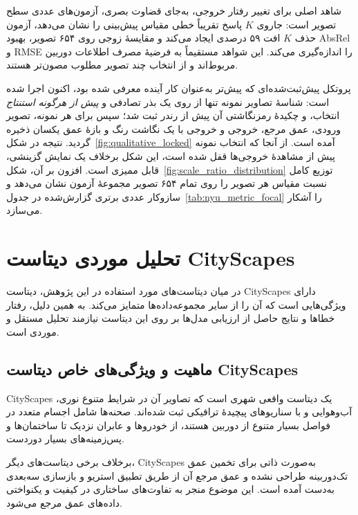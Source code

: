 شاهد اصلی برای تغییر رفتار خروجی، به‌جای قضاوت بصری، آزمون‌های عددی سطح تصویر است: جاروی $K$ پاسخ تقریباً خطی مقیاس پیش‌بینی را نشان می‌دهد، آزمون حذف $K$ افت ۵۹ درصدی ایجاد می‌کند و مقایسهٔ زوجی روی ۶۵۴ تصویر، بهبود AbsRel و RMSE را اندازه‌گیری می‌کند. این شواهد مستقیماً به فرضیهٔ مصرف اطلاعات دوربین مربوط‌اند و از انتخاب چند تصویر مطلوب مصون‌تر هستند.

پروتکل پیش‌ثبت‌شده‌ای که پیش‌تر به‌عنوان کار آینده معرفی شده بود، اکنون اجرا
شده است: شناسهٔ تصاویر نمونه تنها از روی یک بذر تصادفی و \emph{پیش از هرگونه
استنتاج} انتخاب، و چکیدهٔ رمزنگاشتی آن پیش از رندر ثبت شد؛ سپس برای هر نمونه،
تصویر ورودی، عمق مرجع، خروجی \controlmodel{} و خروجی \proposedmodel{} با یک
نگاشت رنگ و بازهٔ عمق یکسان ذخیره گردید. نتیجه در
شکل~\ref{fig:qualitative_locked} آمده است. از آنجا که انتخاب نمونه پیش از
مشاهدهٔ خروجی‌ها قفل شده است، این شکل برخلاف یک نمایش گزینشی، قابل ممیزی است.
افزون بر آن، شکل~\ref{fig:scale_ratio_distribution} توزیع کامل نسبت مقیاس هر
تصویر را روی تمام ۶۵۴ تصویر مجموعهٔ آزمون نشان می‌دهد و سازوکار عددی برتری
گزارش‌شده در جدول~\ref{tab:nyu_metric_focal} را آشکار می‌سازد.




\section{تحلیل موردی دیتاست CityScapes}
\label{sec:cityscapes_analysis}

در میان دیتاست‌های مورد استفاده در این پژوهش،
دیتاست CityScapes
دارای ویژگی‌هایی است که آن را
از سایر مجموعه‌داده‌ها متمایز می‌کند.
به همین دلیل،
رفتار خطاها و نتایج حاصل از ارزیابی مدل‌ها
بر روی این دیتاست
نیازمند تحلیل مستقل و موردی است.

\subsection{ماهیت و ویژگی‌های خاص دیتاست CityScapes}
\label{subsec:cityscapes_nature}

CityScapes
یک دیتاست واقعی شهری
است که تصاویر آن
در شرایط متنوع نوری، آب‌وهوایی
و با سناریوهای پیچیدهٔ ترافیکی ثبت شده‌اند.
صحنه‌ها شامل اجسام متعدد
در فواصل بسیار متنوع از دوربین هستند،
از خودروها و عابران نزدیک
تا ساختمان‌ها و پس‌زمینه‌های بسیار دوردست.

برخلاف برخی دیتاست‌های دیگر،
CityScapes
به‌صورت ذاتی برای تخمین عمق تک‌دوربینه طراحی نشده
و عمق مرجع آن
از طریق تطبیق استریو و بازسازی سه‌بعدی
به‌دست آمده است.
این موضوع منجر به تفاوت‌های ساختاری
در کیفیت و یکنواختی داده‌های عمق مرجع می‌شود.

